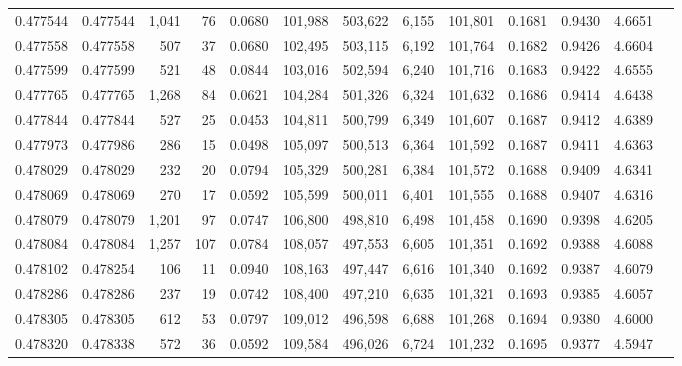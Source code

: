 \begin{tabular}{rrrrrrrrrrrrr}
0.477544 & 0.477544 & 1,041 &    76 &                                     0.0680 & 101,988 & 503,622 &   6,155 & 101,801 & 0.1681 & 0.9430 & 4.6651 \\
0.477558 & 0.477558 &   507 &    37 &                                     0.0680 & 102,495 & 503,115 &   6,192 & 101,764 & 0.1682 & 0.9426 & 4.6604 \\
0.477599 & 0.477599 &   521 &    48 &                                     0.0844 & 103,016 & 502,594 &   6,240 & 101,716 & 0.1683 & 0.9422 & 4.6555 \\
0.477765 & 0.477765 & 1,268 &    84 &                                     0.0621 & 104,284 & 501,326 &   6,324 & 101,632 & 0.1686 & 0.9414 & 4.6438 \\
0.477844 & 0.477844 &   527 &    25 &                                     0.0453 & 104,811 & 500,799 &   6,349 & 101,607 & 0.1687 & 0.9412 & 4.6389 \\
0.477973 & 0.477986 &   286 &    15 &                                     0.0498 & 105,097 & 500,513 &   6,364 & 101,592 & 0.1687 & 0.9411 & 4.6363 \\
0.478029 & 0.478029 &   232 &    20 &                                     0.0794 & 105,329 & 500,281 &   6,384 & 101,572 & 0.1688 & 0.9409 & 4.6341 \\
0.478069 & 0.478069 &   270 &    17 &                                     0.0592 & 105,599 & 500,011 &   6,401 & 101,555 & 0.1688 & 0.9407 & 4.6316 \\
0.478079 & 0.478079 & 1,201 &    97 &                                     0.0747 & 106,800 & 498,810 &   6,498 & 101,458 & 0.1690 & 0.9398 & 4.6205 \\
0.478084 & 0.478084 & 1,257 &   107 &                                     0.0784 & 108,057 & 497,553 &   6,605 & 101,351 & 0.1692 & 0.9388 & 4.6088 \\
0.478102 & 0.478254 &   106 &    11 &                                     0.0940 & 108,163 & 497,447 &   6,616 & 101,340 & 0.1692 & 0.9387 & 4.6079 \\
0.478286 & 0.478286 &   237 &    19 &                                     0.0742 & 108,400 & 497,210 &   6,635 & 101,321 & 0.1693 & 0.9385 & 4.6057 \\
0.478305 & 0.478305 &   612 &    53 &                                     0.0797 & 109,012 & 496,598 &   6,688 & 101,268 & 0.1694 & 0.9380 & 4.6000 \\
0.478320 & 0.478338 &   572 &    36 &                                     0.0592 & 109,584 & 496,026 &   6,724 & 101,232 & 0.1695 & 0.9377 & 4.5947 \\

\end{tabular}
